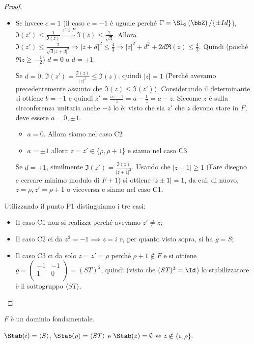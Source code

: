 \begin{proof}
\begin{itemize}
\item Se invece $c=1$ (il caso $c=-1$ è uguale perché
  $\Gamma=\SL_2 \left( \bbZ \right)/\{\pm Id\}$),
  $\Im(z') \leq \frac{1}{\Im(z)} \stackrel{z' \in F}{\Rightarrow} \Im(z) \leq \frac{2}{\sqrt{3}}$.
  Allora $\Im(z') \leq \frac{2}{\sqrt{3}|z+d|^2} \Rightarrow
  |z+d|^2 \leq \frac{4}{3} \Rightarrow |z|^2+d^2+2d \Re(z) \leq \frac{4}{3}$. 
  Quindi (poiché $\Re z \ge -\frac{1}{2}$) $d=0$ o $d=\pm 1$.

  Se $d=0$, $\Im(z') = \frac{\Im(z)}{|z|^2} \leq \Im(z)$, quindi $|z|=1$ (Perché avevamo precedentemente assunto che $\Im(z) \le \Im(z')$).
  Considerando il determinante si ottiene $b = -1$ e quindi $z' = \frac{az - 1}{z} = a - \frac{1}{z} = a - \bar{z}$. Siccome $z$ è sulla circonferenza unitaria anche $- \bar{z}$ lo è; visto che sia $z'$ che $z$ devono stare in $F$, deve essere $a = 0, \pm 1$.
  \begin{itemize}
  \item $a = 0$. Allora siamo nel caso C2
  \item $a = \pm 1$ allora $z = z' \in \{\rho, \rho + 1\}$ e siamo nel caso C3
  \end{itemize}

  Se $d=\pm 1$, similmente $\Im(z') = \frac{\Im(z)}{|z \pm 1|^2}$. Usando che $|z \pm 1| \ge 1$ (Fare disegno e cercare minimo modulo di $F + 1$)
  si ottiene $|z \pm 1|=1$, da cui, di nuovo, $z=\rho, z'=\rho + 1$ o viceversa e siamo nel caso C1.
\end{itemize}

\bigskip
{} Utilizzando il punto P1 distinguiamo i tre casi:
\begin{itemize}
\item Il caso C1 non si realizza perché avevamo $z' \neq z$;
\item Il caso C2 ci da $z^2 = -1 \implies z = i$ e, per quanto visto sopra, si ha $g = S$;
\item Il caso C3 ci da solo $z = z' = \rho$ perché $\rho + 1 \notin F$ e si ottiene $g = \left(\begin{array}{cc} -1 & -1 \\ 1 & 0 \\ \end{array} \right) = (ST)^2$, quindi (visto che $(ST)^3 = \Id$) lo stabilizzatore è il sottogruppo $\langle ST \rangle$.
\end{itemize}
\end{proof}

\begin{corollario}
$F$ è un dominio fondamentale.

$\Stab(i)=\left\langle S \right\rangle$, 
$\Stab(\rho)=\left\langle ST \right\rangle$ e $\Stab(z)=\emptyset$ se 
$z \notin \{i, \rho \}$.
\end{corollario}

